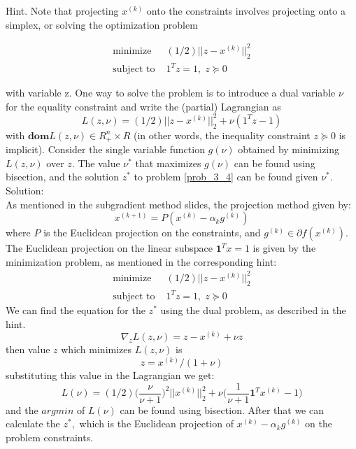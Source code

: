 \documentclass{article}
\begin{document}
Hint. Note that projecting $x^{(k)}$ onto the constraints involves projecting onto a
simplex, or solving the optimization problem

\begin{align}
	\text{minimize } &(1/2)||z - x^{(k)}||_2^2 \nonumber \\
	\text{subject to } & {1}^T z = 1, \;
	z \succeq 0 \label{prob_3_4}
\end{align} 

with variable z. One way to solve the problem is to introduce a dual variable $\nu$
for the equality constraint and write the (partial) Lagrangian as
$$
L(z, \nu) = (1/2)||z - x^{(k)}||_2^2 + \nu ({1}^T z - 1)
$$
with $\mathbf{dom} L(z, \nu) \in R^n_+ \times R$ (in other words, the 
inequality constraint $z \succeq 0 $
is implicit). Consider the single variable function
$g(\nu)$ obtained by minimizing
$L(z, \nu)$ over $z.$ The value $\nu^*$ that maximizes $g(\nu)$ 
can be found using bisection,
and the solution $z^*$ to problem \ref{prob_3_4} can be found given $\nu^*.$ \\

Solution:\\

As mentioned in the subgradient method slides, 
the projection method given by:
$$
x^{(k+1)} = P(x^{(k)} - \alpha_k g^{(k)})
$$
where $P$ is the Euclidean projection on the constraints, 
and $g^{(k)} \in \partial f(x^{(k)}).$
The Euclidean projection on the linear subspace 
$\mathbf{1}^T x = 1$ is given by the minimization problem, as mentioned in the corresponding hint: 
\begin{align}
	\text{minimize } &(1/2)||z - x^{(k)}||_2^2 \nonumber \\
	\text{subject to } & {1}^T z = 1, \;
	z \succeq 0 
\end{align} 
We can find the equation for the $z^*$ using the dual problem, as described in the hint. 
$$
\nabla_z L(z, \nu) = z - x^{(k)} + \nu z
$$
then value $z$ which minimizes $L(z, \nu)$ is
$$
z = x^{(k)} / (1 + \nu)
$$
substituting this value in the Lagrangian we get:
$$
L(\nu) = (1/2) \bigg(\frac{\nu}{\nu+1}\bigg)^2 ||x^{(k)}||_2^2 + 
\nu \big(\frac{1}{\nu + 1} \mathbf{1}^T x^{(k)} - 1 \big) 
$$ 
and the $argmin$ of $L(\nu)$ can be found using bisection. After that we can calculate the $z^*,$ which is the Euclidean projection of $x^{(k)} - \alpha_k g^{(k)}$ on the problem constraints.
\end{document}
